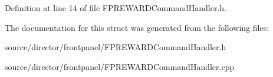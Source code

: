 Definition at line 14 of file F\-P\-R\-E\-W\-A\-R\-D\-Command\-Handler.\-h.



The documentation for this struct was generated from the following files\-:\begin{DoxyCompactItemize}
\item 
source/director/frontpanel/F\-P\-R\-E\-W\-A\-R\-D\-Command\-Handler.\-h\item 
source/director/frontpanel/F\-P\-R\-E\-W\-A\-R\-D\-Command\-Handler.\-cpp\end{DoxyCompactItemize}
